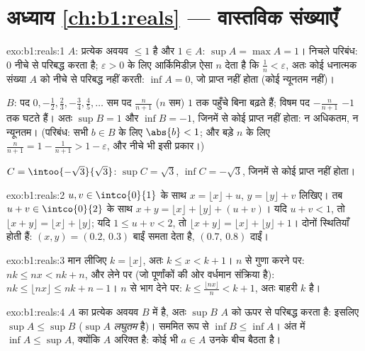\section*{अध्याय \ref{ch:b1:reals} --- वास्तविक संख्याएँ}

\begin{solution}{exo:b1:reals:1}
$A$: प्रत्येक अवयव $\leq 1$ है और $1 \in A$: $\sup A = \max A = 1$। निचले
परिबंध: $0$ नीचे से परिबद्ध करता है; $\varepsilon > 0$ के लिए आर्किमिडीज़
ऐसा $n$ देता है कि $\frac 1n < \varepsilon$, अतः कोई धनात्मक संख्या $A$ को
नीचे से परिबद्ध नहीं करती: $\inf A = 0$, जो प्राप्त नहीं होता (कोई न्यूनतम
नहीं)।

$B$: पद $0, -\frac12, \frac23, -\frac34, \frac45, \dots$ सम पद
$\frac{n}{n+1}$ ($n$ सम) $1$ तक पहुँचे बिना बढ़ते हैं; विषम पद
$-\frac{n}{n+1}$ $-1$ तक घटते हैं। अतः $\sup B = 1$ और $\inf B = -1$, जिनमें
से कोई प्राप्त नहीं होता: न अधिकतम, न न्यूनतम। (परिबंध: सभी $b \in B$ के लिए
$\abs{b} < 1$; और बड़े $n$ के लिए $\frac{n}{n+1} = 1 - \frac{1}{n+1} > 1 -
\varepsilon$, और नीचे भी इसी प्रकार।)

$C = \intoo{-\sqrt 3}{\sqrt 3}$: $\sup C = \sqrt 3$, $\inf C = -\sqrt 3$,
जिनमें से कोई प्राप्त नहीं होता।
\end{solution}

\begin{solution}{exo:b1:reals:2}
$u, v \in \intco{0}{1}$ के साथ $x = \lfloor x \rfloor + u$, $y = \lfloor y
\rfloor + v$ लिखिए। तब $u + v \in \intco{0}{2}$ के साथ $x + y = \lfloor x
\rfloor + \lfloor y \rfloor + (u + v)$। यदि $u + v < 1$, तो $\lfloor x +
y\rfloor = \lfloor x\rfloor + \lfloor y \rfloor$; यदि $1 \leq u + v < 2$, तो
$\lfloor x+y \rfloor = \lfloor x \rfloor + \lfloor y \rfloor + 1$। दोनों
स्थितियाँ होती हैं: $(x, y) = (0.2,\, 0.3)$ बाईं समता देता है, $(0.7,\,
0.8)$ दाईं।
\end{solution}

\begin{solution}{exo:b1:reals:3}
मान लीजिए $k = \lfloor x \rfloor$, अतः $k \leq x < k + 1$। $n$ से गुणा करने
पर: $nk \leq nx < nk + n$, और  लेने पर (जो पूर्णांकों की ओर वर्धमान
संक्रिया है): $nk \leq \lfloor nx \rfloor \leq nk + n - 1$। $n$ से भाग देने
पर: $k \leq \frac{\lfloor nx \rfloor}{n} < k + 1$, अतः बाहरी  $k$ है।
\end{solution}

\begin{solution}{exo:b1:reals:4}
$A$ का प्रत्येक अवयव $B$ में है, अतः $\sup B$ $A$ को ऊपर से परिबद्ध करता है:
इसलिए $\sup A \leq \sup B$ ($\sup A$ \emph{लघुतम}  है)। सममित रूप
से $\inf B \leq \inf A$। अंत में $\inf A \leq \sup A$, क्योंकि $A$ अरिक्त
है: कोई भी $a \in A$ उनके बीच बैठता है।
\end{solution}

